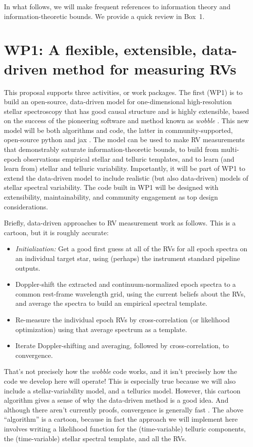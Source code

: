 \documentclass[12pt]{article}
\begin{document}
In what follows, we will make frequent references to information theory and information-theoretic bounds.
We provide a quick review in Box~1.

\section{WP1: A flexible, extensible, data-driven method for measuring RVs}

This proposal supports three activities, or work packages. The first (WP1) is to build an open-source, data-driven model for one-dimensional high-resolution stellar spectroscopy that has good causal structure and is highly extensible, based on the success of the pioneering software and method known as \textsl{wobble} \cite{Bedell2019}.
This new model will be both algorithms and code, the latter in community-supported, open-source python and jax \cite{jax}.
The model can be used to make RV measurements that demonstrably saturate information-theoretic bounds, to build from multi-epoch observations empirical stellar and telluric templates, and to learn (and learn from) stellar and telluric variability.
Importantly, it will be part of WP1 to extend the data-driven model to include realistic (but also data-driven) models of stellar spectral variability.
The code built in WP1 will be designed with extensibility, maintainability, and community engagement as top design considerations.

Briefly, data-driven approaches to RV measurement work as follows. This is a cartoon, but it is roughly accurate:
\begin{itemize}
    \item \emph{Initialization:} Get a good first guess at all of the RVs for all epoch spectra on an individual target star, using (perhaps) the instrument standard pipeline outputs.
    \item Doppler-shift the extracted and continuum-normalized epoch spectra to a common rest-frame wavelength grid, using the current beliefs about the RVs, and average the spectra to build an empirical spectral template.
    \item Re-measure the individual epoch RVs by cross-correlation (or likelihood optimization) using that average spectrum as a template.
    \item Iterate Doppler-shifting and averaging, followed by cross-correlation, to convergence.
\end{itemize}
That's not precisely how the \textsl{wobble} code works, and it isn't precisely how the code we develop here will operate!
This is especially true because we will also include a stellar-variability model, and a tellurics model.
However, this cartoon algorithm gives a sense of why the data-driven method is a good idea.
And although there aren't currently proofs, convergence is generally fast \cite{Bedell2019}.
The above ``algorithm'' is a cartoon, because in fact the approach we will implement here involves writing a likelihood function for the (time-variable) telluric components, the (time-variable) stellar spectral template, and all the RVs.
\end{document}
